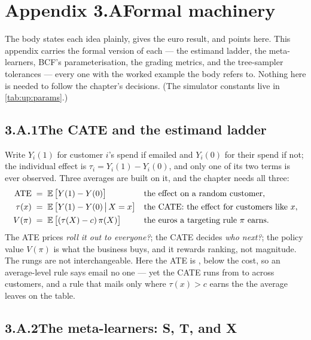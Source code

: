 \section*{Appendix 3.A\quad Formal machinery}
\label{app:up:tol}

The body states each idea plainly, gives the euro result, and points here. This appendix carries the
formal version of each --- the estimand ladder, the meta-learners, BCF's parameterisation, the grading
metrics, and the tree-sampler tolerances --- every one with the worked example the body refers to.
Nothing here is needed to follow the chapter's decisions. (The simulator constants live in
\cref{tab:up:params}.)

\subsection*{3.A.1\quad The CATE and the estimand ladder}

Write $Y_i(1)$ for customer $i$'s spend if emailed and $Y_i(0)$ for their spend if not; the individual
effect is $\tau_i = Y_i(1) - Y_i(0)$, and only one of its two terms is ever observed. Three averages
are built on it, and the chapter needs all three:
%
\begin{align}
  \text{ATE} &\;=\; \operatorname{\mathbb{E}}\big[Y(1) - Y(0)\big]
     &&\text{the effect on a random customer,} \label{eq:up:appate}\\
  \tau(x) &\;=\; \operatorname{\mathbb{E}}\big[Y(1) - Y(0) \,\big|\, X = x\big]
     &&\text{the CATE: the effect for customers like } x, \label{eq:up:appcate}\\
  V(\pi) &\;=\; \operatorname{\mathbb{E}}\big[(\tau(X) - c)\,\pi(X)\big]
     &&\text{the euros a targeting rule } \pi \text{ earns.} \label{eq:up:apppolicy}
\end{align}
%
The ATE prices \emph{roll it out to everyone?}; the CATE decides \emph{who next?}; the policy value
$V(\pi)$ is what the business buys, and it rewards ranking, not magnitude. The rungs are not
interchangeable. Here the ATE is \eur{\nbOneTrueAte}, below the \eur{\nbOneCost} cost, so an
average-level rule says email no one --- yet the CATE runs from \eur{\nbOneTauLo} to \eur{\nbOneTauHi}
across customers, and a rule that mails only where $\tau(x) > c$ earns the \eur{\nbOneOracleProfit} the
average leaves on the table.

\subsection*{3.A.2\quad The meta-learners: S, T, and X}

